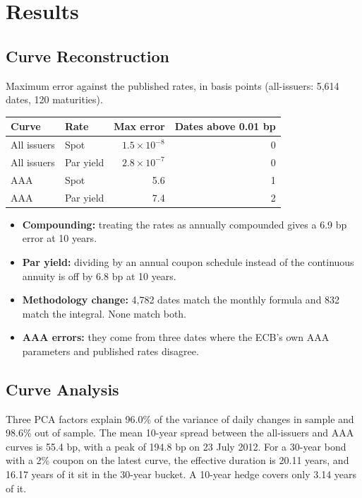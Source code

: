 \documentclass[11pt,a4paper]{article}
\begin{document}
\section{Results}

\subsection{Curve Reconstruction}

Maximum error against the published rates, in basis points (all-issuers: 5,614 dates, 120 maturities).

\begin{center}
\begin{tabular}{llrr}
\toprule
Curve & Rate & Max error & Dates above 0.01 bp \\
\midrule
All issuers & Spot & $1.5\times10^{-8}$ & 0 \\
All issuers & Par yield & $2.8\times10^{-7}$ & 0 \\
AAA & Spot & 5.6 & 1 \\
AAA & Par yield & 7.4 & 2 \\
\bottomrule
\end{tabular}
\end{center}

\begin{itemize}
\item \textbf{Compounding:} treating the rates as annually compounded gives a 6.9 bp error at 10 years.
\item \textbf{Par yield:} dividing by an annual coupon schedule instead of the continuous annuity is off by 6.8 bp at 10 years.
\item \textbf{Methodology change:} 4,782 dates match the monthly formula and 832 match the integral. None match both.
\item \textbf{AAA errors:} they come from three dates where the ECB's own AAA parameters and published rates disagree.
\end{itemize}

\subsection{Curve Analysis}

Three PCA factors explain 96.0\% of the variance of daily changes in sample and 98.6\% out of sample. The mean 10-year spread between the all-issuers and AAA curves is 55.4 bp, with a peak of 194.8 bp on 23 July 2012. For a 30-year bond with a 2\% coupon on the latest curve, the effective duration is 20.11 years, and 16.17 years of it sit in the 30-year bucket. A 10-year hedge covers only 3.14 years of it.
\end{document}
